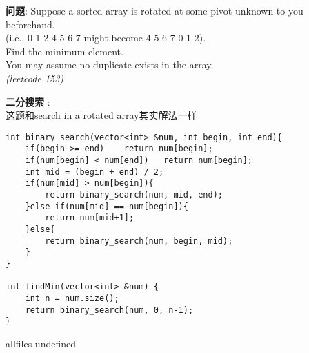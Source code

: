 \documentclass{article}
\begin{document}
\begin{CJK}{UTF8}{gbsn}     %

\else
    
\begin{description}
    \item{\textbf{问题}}: Suppose a sorted array is rotated at some pivot unknown to you beforehand. \\
(i.e., 0 1 2 4 5 6 7 might become 4 5 6 7 0 1 2).\\
Find the minimum element.\\
You may assume no duplicate exists in the array.\\
\textit{(leetcode 153)}
    \item{\textbf{二分搜索}} : 
    \\这题和search in a rotated array其实解法一样
    \begin{lstlisting}
int binary_search(vector<int> &num, int begin, int end){
	if(begin >= end)	return num[begin];
	if(num[begin] < num[end])	return num[begin];
	int mid = (begin + end) / 2;
	if(num[mid] > num[begin]){
		return binary_search(num, mid, end);
	}else if(num[mid] == num[begin]){
		return num[mid+1];
	}else{
		return binary_search(num, begin, mid);
	}
}

int findMin(vector<int> &num) {
	int n = num.size();
	return binary_search(num, 0, n-1);
}
    \end{lstlisting}
\end{description}

\fi

\ifx allfiles undefined
\end{CJK}
\end{document}
